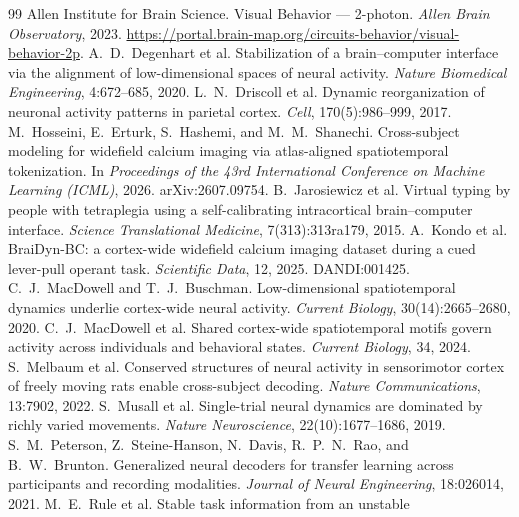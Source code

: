 \documentclass[mlabstract,onecolumn]{jmlr}
\begin{document}
\begin{thebibliography}{99}
 Allen Institute for Brain Science.
Visual Behavior --- 2-photon. \emph{Allen Brain Observatory}, 2023.
\url{https://portal.brain-map.org/circuits-behavior/visual-behavior-2p}.
 A.~D.~Degenhart et al. Stabilization of a
brain--computer interface via the alignment of low-dimensional spaces of neural activity.
\emph{Nature Biomedical Engineering}, 4:672--685, 2020.
 L.~N.~Driscoll et al. Dynamic reorganization of
neuronal activity patterns in parietal cortex. \emph{Cell}, 170(5):986--999, 2017.
 M.~Hosseini, E.~Erturk, S.~Hashemi, and M.~M.~Shanechi.
Cross-subject modeling for widefield calcium imaging via atlas-aligned spatiotemporal tokenization.
In \emph{Proceedings of the 43rd International Conference on Machine Learning (ICML)}, 2026.
arXiv:2607.09754.
 B.~Jarosiewicz et al. Virtual typing by people
with tetraplegia using a self-calibrating intracortical brain--computer interface. \emph{Science
Translational Medicine}, 7(313):313ra179, 2015.
 A.~Kondo et al. BraiDyn-BC: a cortex-wide widefield calcium
imaging dataset during a cued lever-pull operant task. \emph{Scientific Data}, 12, 2025.
DANDI:001425.
 C.~J.~MacDowell and T.~J.~Buschman.
Low-dimensional spatiotemporal dynamics underlie cortex-wide neural activity. \emph{Current
Biology}, 30(14):2665--2680, 2020.
 C.~J.~MacDowell et al. Shared cortex-wide
spatiotemporal motifs govern activity across individuals and behavioral states. \emph{Current
Biology}, 34, 2024.
 S.~Melbaum et al. Conserved structures of neural
activity in sensorimotor cortex of freely moving rats enable cross-subject decoding. \emph{Nature
Communications}, 13:7902, 2022.
 S.~Musall et al. Single-trial neural dynamics are
dominated by richly varied movements. \emph{Nature Neuroscience}, 22(10):1677--1686, 2019.
 S.~M.~Peterson, Z.~Steine-Hanson, N.~Davis,
R.~P.~N.~Rao, and B.~W.~Brunton. Generalized neural decoders for transfer learning across
participants and recording modalities. \emph{Journal of Neural Engineering}, 18:026014, 2021.
 M.~E.~Rule et al. Stable task information from an unstable

\end{thebibliography}
\end{document}

